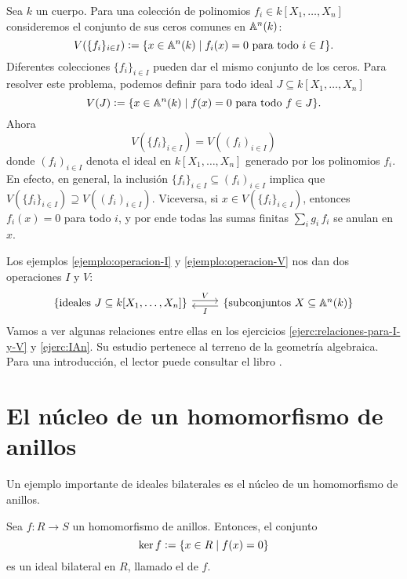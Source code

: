 \begin{ejemplo}
  \label{ejemplo:operacion-V}
  Sea $k$ un cuerpo. Para una colección de polinomios
  $f_i \in k [X_1,\ldots,X_n]$ consideremos el conjunto de sus ceros comunes
  en $\AA^n (k)$:
  \[ V ( \{ f_i \}_{i\in I} ) \dfn
     \{ x\in \AA^n (k) \mid f_i (x) = 0\text{ para todo }i\in I \}. \]
  Diferentes colecciones $\{ f_i \}_{i\in I}$ pueden dar el mismo conjunto
  de los ceros. Para resolver este problema, podemos definir para todo ideal
  $J \subseteq k [X_1,\ldots,X_n]$
  $$V (J) \dfn \{ x\in \AA^n (k) \mid f (x) = 0\text{ para todo }f\in J \}.$$
  Ahora
  $$V ( \{ f_i \}_{i\in I} ) = V ((f_i)_{i\in I})$$
  donde $(f_i)_{i\in I}$ denota el ideal en $k [X_1,\ldots,X_n]$ generado por
  los polinomios $f_i$. En efecto, en general, la inclusión
  $\{ f_i \}_{i\in I} \subseteq (f_i)_{i\in I}$ implica que
  $V (\{ f_i \}_{i\in I}) \supseteq V ((f_i)_{i\in I})$. Viceversa,
  si $x\in V (\{ f_i \}_{i\in I})$, entonces $f_i (x) = 0$ para todo $i$,
  y por ende todas las sumas finitas $\sum_i g_i\,f_i$ se anulan en $x$.
\end{ejemplo}

Los ejemplos \ref{ejemplo:operacion-I} y \ref{ejemplo:operacion-V} nos dan dos
operaciones $I$ y $V$:
\[ \begin{tikzcd}
    \{ \text{ideales }J \subseteq k[X_1,\ldots,X_n] \} \ar[shift left]{r}{V} &
    \{ \text{subconjuntos }X\subseteq \AA^n (k) \} \ar[shift left]{l}{I}
  \end{tikzcd} \]
Vamos a ver algunas relaciones entre ellas en los ejercicios
\ref{ejerc:relaciones-para-I-y-V} y \ref{ejerc:IAn}. Su estudio pertenece
al terreno de la geometría algebraica. Para una introducción, el lector puede
consultar el libro \cite{Fulton-curves}.


\section{El núcleo de un homomorfismo de anillos}

Un ejemplo importante de ideales bilaterales es el núcleo de un homomorfismo
de anillos.

\begin{observacion}
  Sea $f\colon R\to S$ un homomorfismo de anillos. Entonces, el conjunto
  $$\ker f \dfn \{ x\in R \mid f (x) = 0 \}$$
  es un ideal bilateral en $R$, llamado el
   de $f$.
\end{observacion}

